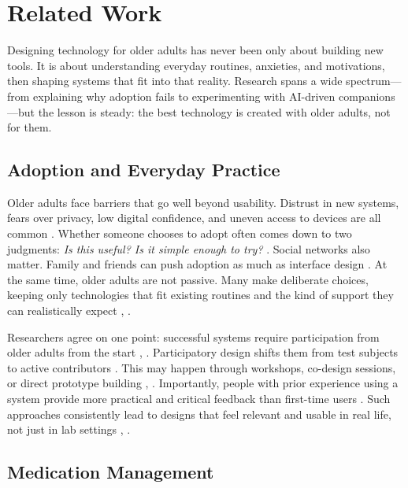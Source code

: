 \documentclass[acmlarge]{acmart}
\begin{document}
\section{Related Work}
Designing technology for older adults has never been only about building
new tools. It is about understanding everyday routines, anxieties, and
motivations, then shaping systems that fit into that reality. Research
spans a wide spectrum---from explaining why adoption fails to
experimenting with AI-driven companions---but the lesson is steady: the
best technology is created with older adults, not for them.

\subsection{Adoption and Everyday Practice}
Older adults face barriers that go well beyond usability. Distrust in
new systems, fears over privacy, low digital confidence, and uneven
access to devices are all common \cite{Ahmad2022}. Whether someone chooses to
adopt often comes down to two judgments: \emph{Is this useful? Is it
simple enough to try?} \cite{info:doi/10.2196/65269}. Social networks also matter. Family and
friends can push adoption as much as interface design \cite{info:doi/10.2196/65269}. At the
same time, older adults are not passive. Many make deliberate choices,
keeping only technologies that fit existing routines and the kind of
support they can realistically expect \cite{10.1093/geront/gny113}, \cite{10.1007/978-3-319-20892-3_47}.

Researchers agree on one point: successful systems require participation
from older adults from the start \cite{10.1007/978-3-540-70540-6_2}, \cite{10.1007/978-3-031-92707-2_9}. Participatory design
shifts them from test subjects to active contributors \cite{10.1145/3357155.3358471}. This may
happen through workshops, co-design sessions, or direct prototype
building \cite{WERNER20223680}, \cite{10.1145/3240925.3240929}. Importantly, people with prior experience using a
system provide more practical and critical feedback than first-time
users \cite{10.1145/3240925.3240929}. Such approaches consistently lead to designs that feel
relevant and usable in real life, not just in lab settings \cite{10.1145/3517428.3544830}, \cite{10.1145/3544548.3580893}.


\subsection{Medication Management}
\end{document}
